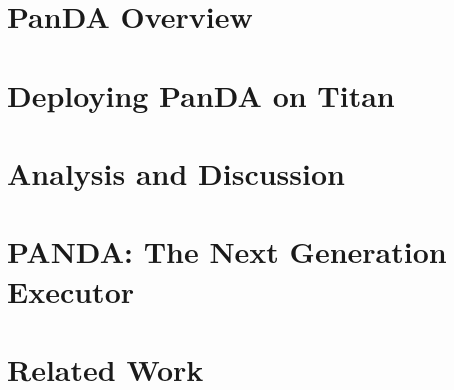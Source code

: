 \documentclass[conference]{IEEEtran}
\begin{document}
\section{PanDA Overview}
\label{sec:panda_overview}



\section{Deploying PanDA on Titan}
\label{sec:panda_titan}



\section{Analysis and Discussion}
\label{sec:panda_titan}



\section{PANDA\@: The Next Generation Executor}
\label{sec:panda_roadmap}




\section{Related Work}
\label{sec:related}

\end{document}
